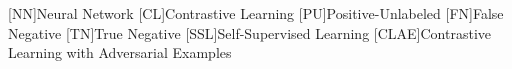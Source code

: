 \begin{acronym}

    [NN]{Neural Network}
    [CL]{Contrastive Learning}
    [PU]{Positive-Unlabeled}
    [FN]{False Negative}
    [TN]{True Negative}
    [SSL]{Self-Supervised Learning}
    [CLAE]{Contrastive Learning with Adversarial Examples}

\end{acronym}